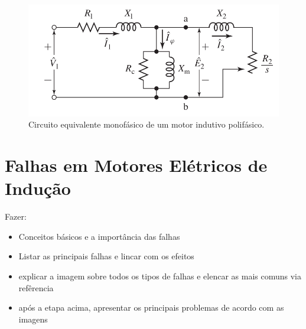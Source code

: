 \begin{figure}[H]
    \caption{Circuito equivalente monofásico de um motor indutivo polifásico.}
    \begin{center}
        \includegraphics[scale=.35]{referencial/img/circuit_fitzgerald_p354.png}
    \end{center}
    \label{fig:}
\end{figure}


% 

\section{Falhas em Motores Elétricos de Indução}\label{sec:}

Fazer:
\begin{itemize}
    \item Conceitos básicos e a importância das falhas
    \item Listar as principais falhas e lincar com os efeitos
    \item explicar a imagem sobre todos os tipos de falhas e elencar as mais comuns via refêrencia
    \item após a etapa acima, apresentar os principais problemas de acordo com as imagens
\end{itemize}

